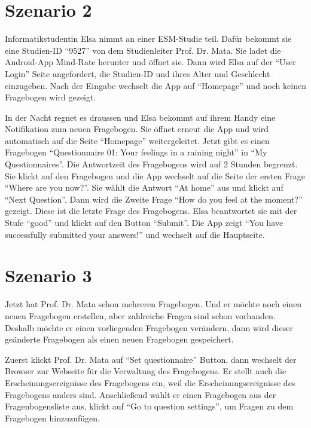 \documentclass[a4paper]{scrreprt}
\begin{document}
            \section{Szenario 2}
	            \par Informatikstudentin Elsa nimmt an einer ESM-Studie teil. Dafür bekommt sie eine Studien-ID ``9527'' von dem Studienleiter Prof. Dr. Mata. Sie ladet die Android-App Mind-Rate herunter und \"offnet sie. Dann wird Elsa auf der ``User Login'' Seite angefordert, die Studien-ID und ihres Alter und Geschlecht einzugeben. Nach der Eingabe wechselt die App auf ``Homepage'' und noch keinen Fragebogen wird gezeigt.

	            \par In der Nacht regnet es draussen und Elsa bekommt auf ihrem Handy eine Notifikation zum neuen Fragebogen. Sie \"offnet erneut die App und wird automatisch auf die Seite ``Homepage'' weitergeleitet. Jetzt gibt es einen Fragebogen ``Questionnaire 01: Your feelings in a raining night'' in ``My Questionnaires''. Die Antwortzeit des Fragebogens wird auf 2 Stunden begrenzt. Sie klickt auf den Fragebogen und die App wechselt auf die Seite der ersten Frage ``Where are you now?''. Sie w\"ahlt die Antwort ``At home'' aus und klickt auf ``Next Question''. Dann wird die Zweite Frage ``How do you feel at the moment?'' gezeigt. Diese ist die letzte Frage des Fragebogens. Elsa beantwortet sie mit der Stufe ``good'' und klickt auf den Button ``Submit''. Die App zeigt “You have successfully submitted your answers!” und wechselt auf die Hauptseite.

            \section{Szenario 3}
                \par Jetzt hat Prof. Dr. Mata schon mehreren Fragebogen. Und er möchte noch einen neuen Fragebogen erstellen, aber zahlreiche Fragen sind schon vorhanden. Deshalb möchte er einen vorliegenden Fragebogen verändern, dann wird dieser geänderte Fragebogen als einen neuen Fragebogen gespeichert.

                \par Zuerst klickt Prof. Dr. Mata auf ``Set questionnaire'' Button, dann wechselt der Browser zur Webseite für die Verwaltung des Fragebogens. Er stellt auch die Erscheinungsereignisse des Fragebogens ein, weil die Erscheinungsereignisse des Fragebogens anders sind. Anschließend wählt er einen Fragebogen aus der Fragenbogensliste aus, klickt auf ``Go to question settings'', um Fragen zu dem Fragebogen hinzuzufügen.
\end{document}
